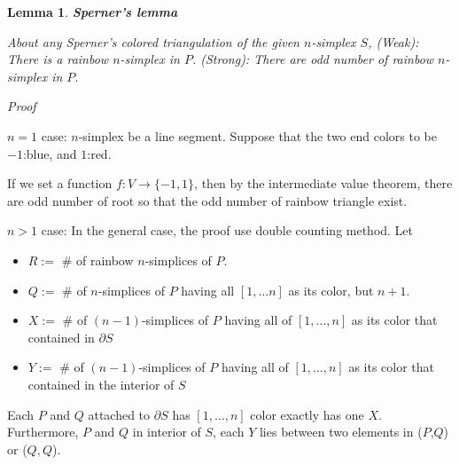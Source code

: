 \documentclass[a4paper,12pt]{article}
\newtheorem{lemma}{Lemma}
\begin{document}
\begin{lemma}\textbf{Sperner's lemma}

    About any Sperner's colored triangulation of the given $n$-simplex $S$,
    (Weak): There is a rainbow $n$-simplex in $P$.
    (Strong): There are odd number of rainbow $n$-simplex in $P$.
\end{lemma}

\textit{Proof} 

$n=1$ case: $n$-simplex be a line segment.
Suppose that the two end colors to be $-1$:blue, and $1$:red. 

\begin{center}
\end{center}

If we set a function $f:V \rightarrow \{-1, 1\}$, then 
by the intermediate value theorem, there are odd number of root
so that the odd number of rainbow triangle exist.

$n>1$ case: In the general case, the proof use double counting method.
Let 

\begin{itemize}
    \item $R :=$ \# of rainbow $n$-simplices of $P$.
    \item $Q :=$ \# of $n$-simplices of $P$ having all $[1, \dots n]$ as its color, but $n+1$.
    \item $X :=$ \# of $(n-1)$-simplices of $P$ having all of $[1, \dots, n]$ as its color that contained in $\partial S$
    \item $Y :=$ \# of $(n-1)$-simplices of $P$ having all of $[1, \dots, n]$ as its color that contained in the interior of $S$
\end{itemize}

Each $P$ and $Q$ attached to $\partial S$ has $[1, \dots, n]$ color exactly 
has one $X$. Furthermore, $P$ and $Q$ in interior of $S$, each $Y$ lies between two elements in ($P$,$Q$) or ($Q, Q$).
\end{document}

